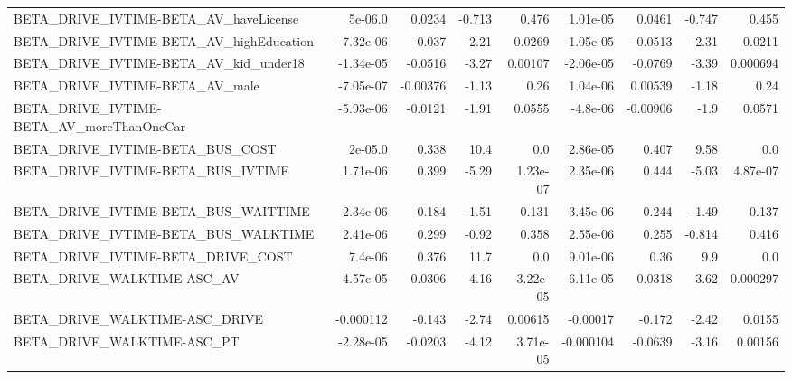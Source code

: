 \begin{tabular}{lrrrrrrrr}
BETA\_DRIVE\_IVTIME-BETA\_AV\_haveLicense              &     5e-06.0 &       0.0234 &   -0.713 &    0.476 &   1.01e-05 &      0.0461 &       -0.747 &         0.455 \\
BETA\_DRIVE\_IVTIME-BETA\_AV\_highEducation            &   -7.32e-06 &       -0.037 &    -2.21 &   0.0269 &  -1.05e-05 &     -0.0513 &        -2.31 &        0.0211 \\
BETA\_DRIVE\_IVTIME-BETA\_AV\_kid\_under18              &   -1.34e-05 &      -0.0516 &    -3.27 &  0.00107 &  -2.06e-05 &     -0.0769 &        -3.39 &      0.000694 \\
BETA\_DRIVE\_IVTIME-BETA\_AV\_male                     &   -7.05e-07 &     -0.00376 &    -1.13 &     0.26 &   1.04e-06 &     0.00539 &        -1.18 &          0.24 \\
BETA\_DRIVE\_IVTIME-BETA\_AV\_moreThanOneCar           &   -5.93e-06 &      -0.0121 &    -1.91 &   0.0555 &   -4.8e-06 &    -0.00906 &         -1.9 &        0.0571 \\
BETA\_DRIVE\_IVTIME-BETA\_BUS\_COST                    &     2e-05.0 &        0.338 &     10.4 &      0.0 &   2.86e-05 &       0.407 &         9.58 &           0.0 \\
BETA\_DRIVE\_IVTIME-BETA\_BUS\_IVTIME                  &    1.71e-06 &        0.399 &    -5.29 & 1.23e-07 &   2.35e-06 &       0.444 &        -5.03 &      4.87e-07 \\
BETA\_DRIVE\_IVTIME-BETA\_BUS\_WAITTIME                &    2.34e-06 &        0.184 &    -1.51 &    0.131 &   3.45e-06 &       0.244 &        -1.49 &         0.137 \\
BETA\_DRIVE\_IVTIME-BETA\_BUS\_WALKTIME                &    2.41e-06 &        0.299 &    -0.92 &    0.358 &   2.55e-06 &       0.255 &       -0.814 &         0.416 \\
BETA\_DRIVE\_IVTIME-BETA\_DRIVE\_COST                  &     7.4e-06 &        0.376 &     11.7 &      0.0 &   9.01e-06 &        0.36 &          9.9 &           0.0 \\
BETA\_DRIVE\_WALKTIME-ASC\_AV                         &    4.57e-05 &       0.0306 &     4.16 & 3.22e-05 &   6.11e-05 &      0.0318 &         3.62 &      0.000297 \\
BETA\_DRIVE\_WALKTIME-ASC\_DRIVE                      &   -0.000112 &       -0.143 &    -2.74 &  0.00615 &   -0.00017 &      -0.172 &        -2.42 &        0.0155 \\
BETA\_DRIVE\_WALKTIME-ASC\_PT                         &   -2.28e-05 &      -0.0203 &    -4.12 & 3.71e-05 &  -0.000104 &     -0.0639 &        -3.16 &       0.00156 \\

\end{tabular}
